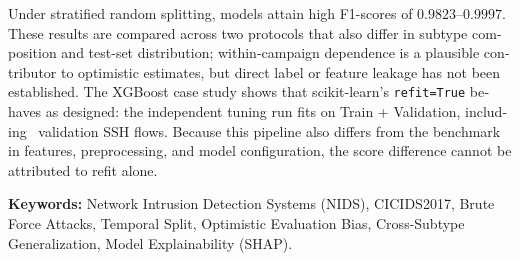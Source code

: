 \begin{otherlanguage}{english}
Under stratified random splitting, models attain high F1-scores of $0.9823 \text{--} 0.9997$. These results are compared across two protocols that also differ in subtype composition and test-set distribution; within-campaign dependence is a plausible contributor to optimistic estimates, but direct label or feature leakage has not been established. The XGBoost case study shows that scikit-learn's \texttt{refit=True} behaves as designed: the independent tuning run fits on Train + Validation, including \DataValidationSSH\ validation SSH flows. Because this pipeline also differs from the benchmark in features, preprocessing, and model configuration, the score difference cannot be attributed to refit alone.

\vspace{0.8cm}
\noindent\textbf{Keywords:} Network Intrusion Detection Systems (NIDS), CICIDS2017, Brute Force Attacks, Temporal Split, Optimistic Evaluation Bias, Cross-Subtype Generalization, Model Explainability (SHAP).
\end{otherlanguage}
